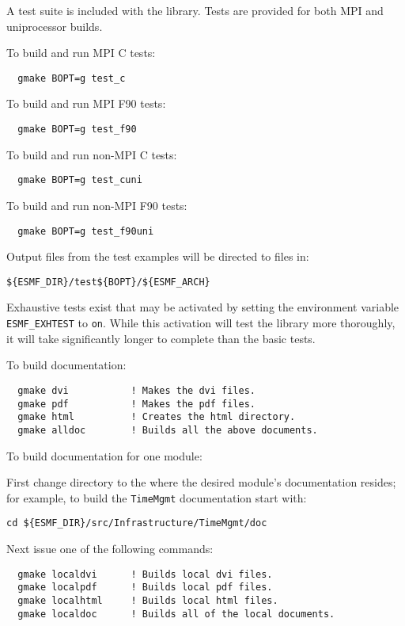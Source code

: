 A test suite is included with the library.  Tests are provided for both MPI
and uniprocessor builds. 

\noindent To build and run MPI C tests:

\begin{verbatim}
  gmake BOPT=g test_c
\end{verbatim}

\noindent To build and run MPI F90 tests:
\begin{verbatim}
  gmake BOPT=g test_f90
\end{verbatim}

\noindent To build and run non-MPI C tests:
\begin{verbatim}
  gmake BOPT=g test_cuni
\end{verbatim}

\noindent To build and run non-MPI F90 tests:
\begin{verbatim}
  gmake BOPT=g test_f90uni
\end{verbatim}

Output files from the test examples will be directed to files in:
\begin{verbatim}
${ESMF_DIR}/test${BOPT}/${ESMF_ARCH}
\end{verbatim}

Exhaustive tests exist that may be activated by setting the environment variable
{\tt ESMF\_EXHTEST} to {\tt on}.  While this activation will test the library more thoroughly,
it will take significantly longer to complete than the basic tests.

\smallskip

\noindent To build documentation:
\begin{verbatim}
  gmake dvi           ! Makes the dvi files.
  gmake pdf           ! Makes the pdf files.
  gmake html          ! Creates the html directory.
  gmake alldoc        ! Builds all the above documents.
\end{verbatim}

\noindent To build documentation for one module:

\noindent First change directory to the where the desired module's documentation resides;  for
example, to build the {\tt TimeMgmt} documentation start with:

\begin{verbatim}
cd ${ESMF_DIR}/src/Infrastructure/TimeMgmt/doc
\end{verbatim}

\noindent Next issue one of the following commands:
\begin{verbatim}
  gmake localdvi      ! Builds local dvi files.
  gmake localpdf      ! Builds local pdf files.
  gmake localhtml     ! Builds local html files.
  gmake localdoc      ! Builds all of the local documents.
\end{verbatim}

